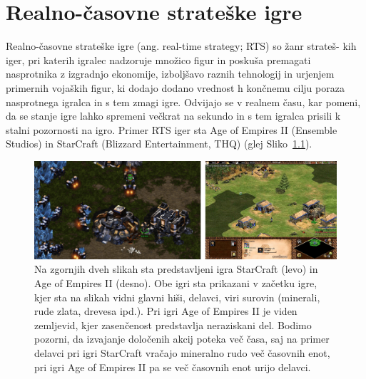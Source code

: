 \documentclass[a4paper, 12pt]{book}
\begin{document}
\chapter{Realno-časovne strateške igre}
\label{chrts}

Realno-časovne strateške igre (ang. real-time strategy; RTS) so žanr strateš- kih iger, pri katerih igralec nadzoruje množico figur in poskuša premagati nasprotnika z izgradnjo ekonomije, izboljšavo raznih tehnologij in urjenjem primernih vojaških figur, ki dodajo dodano vrednost h končnemu cilju poraza nasprotnega igralca in s tem zmagi igre.
Odvijajo se v realnem času, kar pomeni, da se stanje igre lahko spremeni večkrat na sekundo in s tem igralca prisili k stalni pozornosti na igro.
Primer RTS iger sta Age of Empires II (Ensemble Studios) in StarCraft (Blizzard Entertainment, THQ) (glej Sliko~{\ref{picRtsGames}}). 

\begin{figure}[h!]
	\begin{center}
		\includegraphics[width=1.0\textwidth]{photos/horizontal_rts.pdf}
	\end{center}
	\caption{Na zgornjih dveh slikah sta predstavljeni igra StarCraft (levo) in Age of Empires II (desno). 
		Obe igri sta prikazani v začetku igre, kjer sta na slikah vidni glavni hiši, delavci, viri surovin (minerali, rude zlata, drevesa ipd.).
		Pri igri Age of Empires II je viden zemljevid, kjer zasenčenost predstavlja neraziskani del. 
		Bodimo pozorni, da izvajanje določenih akcij poteka več časa, saj na primer delavci pri igri StarCraft vračajo mineralno rudo več časovnih enot, pri igri Age of Empires II pa se več časovnih enot urijo delavci.}
	\label{picRtsGames}
\end{figure}
\end{document}
